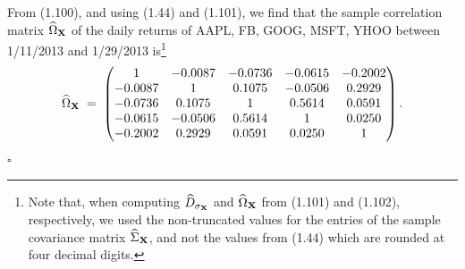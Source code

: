 From (1.100), and using (1.44) and (1.101), we find that the sample
correlation matrix $\widehat{\Omega}_{\mathbf{X}}$ of the daily returns of
AAPL, FB, GOOG, MSFT, YHOO between 1/11/2013 and 1/29/2013
is\footnote{Note that, when computing $\widehat{D}_{\sigma_{\mathbf{X}}}$ and
$\widehat{\Omega}_{\mathbf{X}}$ from (1.101) and (1.102), respectively, we
used the non-truncated values for the entries of the sample covariance
matrix $\widehat{\Sigma}_{\mathbf{X}}$, and not the values from (1.44) which
are rounded at four decimal digits.}
\begin{equation}
\widehat{\Omega}_{\mathbf{X}} \;=\;
\begin{pmatrix}
1 & -0.0087 & -0.0736 & -0.0615 & -0.2002 \\
-0.0087 & 1 & 0.1075 & -0.0506 & 0.2929 \\
-0.0736 & 0.1075 & 1 & 0.5614 & 0.0591 \\
-0.0615 & -0.0506 & 0.5614 & 1 & 0.0250 \\
-0.2002 & 0.2929 & 0.0591 & 0.0250 & 1
\end{pmatrix}.
\end{equation}
\hfill$\square$\par\medskip
